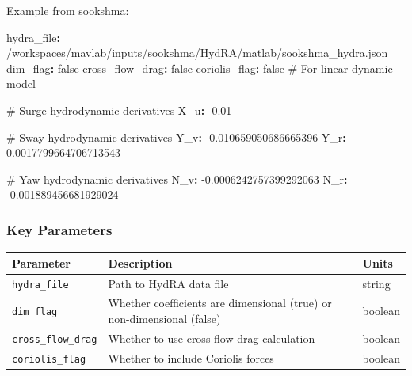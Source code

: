 \documentclass[
  letterpaper,
  DIV=11,
  numbers=noendperiod]{scrreprt}
\newenvironment{Shaded}{\begin{snugshade}}{\end{snugshade}}
\newcommand{\AttributeTok}[1]{\textcolor[rgb]{0.40,0.45,0.13}{#1}}
\newcommand{\CharTok}[1]{\textcolor[rgb]{0.13,0.47,0.30}{#1}}
\newcommand{\CommentTok}[1]{\textcolor[rgb]{0.37,0.37,0.37}{#1}}
\newcommand{\FloatTok}[1]{\textcolor[rgb]{0.68,0.00,0.00}{#1}}
\newcommand{\FunctionTok}[1]{\textcolor[rgb]{0.28,0.35,0.67}{#1}}
\newcommand{\KeywordTok}[1]{\textcolor[rgb]{0.00,0.23,0.31}{\textbf{#1}}}
\begin{document}
Example from sookshma:

\begin{Shaded}
\begin{Highlighting}[]
\FunctionTok{hydra\_file}\KeywordTok{:}\AttributeTok{ /workspaces/mavlab/inputs/sookshma/HydRA/matlab/sookshma\_hydra.json}
\FunctionTok{dim\_flag}\KeywordTok{:}\AttributeTok{ }\CharTok{false}
\FunctionTok{cross\_flow\_drag}\KeywordTok{:}\AttributeTok{ }\CharTok{false}
\FunctionTok{coriolis\_flag}\KeywordTok{:}\AttributeTok{ }\CharTok{false}\CommentTok{ \# For linear dynamic model}

\CommentTok{\# Surge hydrodynamic derivatives}
\FunctionTok{X\_u}\KeywordTok{:}\AttributeTok{ }\FloatTok{{-}0.01}

\CommentTok{\# Sway hydrodynamic derivatives}
\FunctionTok{Y\_v}\KeywordTok{:}\AttributeTok{ }\FloatTok{{-}0.010659050686665396}
\FunctionTok{Y\_r}\KeywordTok{:}\AttributeTok{ }\FloatTok{0.0017799664706713543}

\CommentTok{\# Yaw hydrodynamic derivatives}
\FunctionTok{N\_v}\KeywordTok{:}\AttributeTok{ }\FloatTok{{-}0.0006242757399292063}
\FunctionTok{N\_r}\KeywordTok{:}\AttributeTok{ }\FloatTok{{-}0.001889456681929024}
\end{Highlighting}
\end{Shaded}

\subsubsection*{Key Parameters}\label{key-parameters-3}

\begin{longtable}[]{@{}
  >{\raggedright\arraybackslash}p{}
  >{\raggedright\arraybackslash}p{}
  >{\raggedright\arraybackslash}p{}@{}}
\toprule\noalign{}
\begin{minipage}[b]{\linewidth}\raggedright
Parameter
\end{minipage} & \begin{minipage}[b]{\linewidth}\raggedright
Description
\end{minipage} & \begin{minipage}[b]{\linewidth}\raggedright
Units
\end{minipage} \\
\midrule\noalign{}
\endhead
\bottomrule\noalign{}
\endlastfoot
\texttt{hydra\_file} & Path to HydRA data file & string \\
\texttt{dim\_flag} & Whether coefficients are dimensional (true) or
non-dimensional (false) & boolean \\
\texttt{cross\_flow\_drag} & Whether to use cross-flow drag calculation
& boolean \\
\texttt{coriolis\_flag} & Whether to include Coriolis forces &
boolean \\
\end{longtable}
\end{document}

